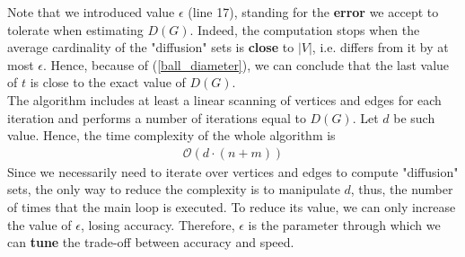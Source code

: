 \medskip
\noindent Note that we introduced value $\epsilon$ (line 17), standing for the \textbf{error} we accept to tolerate when estimating $D(G)$. Indeed, the computation stops when the average cardinality of the "diffusion" sets is \textbf{close} to $|V|$, i.e. differs from it by at most $\epsilon$. Hence, because of (\ref{ball_diameter}), we can conclude that the last value of $t$ is close to the exact value of $D(G)$.\\
The algorithm includes at least a linear scanning of vertices and edges for each iteration and performs a number of iterations equal to $D(G)$. Let $d$ be such value. Hence, the time complexity of the whole algorithm is
\begin{align*}
\mathcal{O}(d \cdot (n + m))
\end{align*}
Since we necessarily need to iterate over vertices and edges to compute "diffusion" sets, the only way to reduce the complexity is to manipulate $d$, thus, the number of times that the main loop is executed. To reduce its value, we can only increase the value of $\epsilon$, losing accuracy. Therefore, $\epsilon$ is the parameter through which we can \textbf{tune} the trade-off between accuracy and speed.









